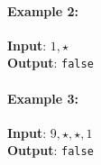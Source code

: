 \paragraph{Example 2:}
\begin{flushleft}
\textbf{Input}: $1,\star$
\\
\textbf{Output}: \texttt{false}
\end{flushleft}

\paragraph{Example 3:}
\begin{flushleft}
\textbf{Input}: $9,\star,\star,1$
\\
\textbf{Output}: \texttt{false}
\end{flushleft}